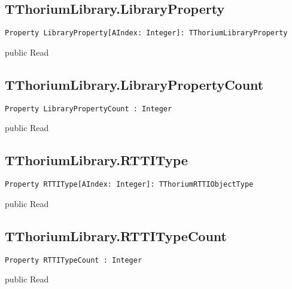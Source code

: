\subsection{TThoriumLibrary.LibraryProperty}
\label{thoriumcorepkg:thorium:tthoriumlibrary:libraryproperty}
\begin{FPCList}
\Declaration 

\begin{verbatim}
Property LibraryProperty[AIndex: Integer]: TThoriumLibraryProperty
\end{verbatim}
\Visibility
public
\Access
Read
\end{FPCList}
\subsection{TThoriumLibrary.LibraryPropertyCount}
\label{thoriumcorepkg:thorium:tthoriumlibrary:librarypropertycount}
\begin{FPCList}
\Declaration 

\begin{verbatim}
Property LibraryPropertyCount : Integer
\end{verbatim}
\Visibility
public
\Access
Read
\end{FPCList}
\subsection{TThoriumLibrary.RTTIType}
\label{thoriumcorepkg:thorium:tthoriumlibrary:rttitype}
\begin{FPCList}
\Declaration 

\begin{verbatim}
Property RTTIType[AIndex: Integer]: TThoriumRTTIObjectType
\end{verbatim}
\Visibility
public
\Access
Read
\end{FPCList}
\subsection{TThoriumLibrary.RTTITypeCount}
\label{thoriumcorepkg:thorium:tthoriumlibrary:rttitypecount}
\begin{FPCList}
\Declaration 

\begin{verbatim}
Property RTTITypeCount : Integer
\end{verbatim}
\Visibility
public
\Access
Read
\end{FPCList}
